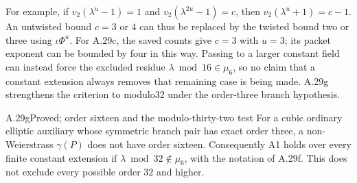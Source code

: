 For example, if $v_2(\lambda^u-1)=1$ and
$v_2(\lambda^{2u}-1)=c$, then
$v_2(\lambda^u+1)=c-1$. An untwisted bound
$c=3$ or $4$ can thus be replaced by the twisted
bound two or three using $\iota\Phi^u$. For A.29c,
the saved counts give $c=3$ with $u=3$; its
packet exponent can be bounded by four in this
way. Passing to a larger constant field can
instead force the excluded residue
$\lambda\bmod16\in\mu_6$, so no claim that a
constant extension always removes that remaining
case is being made. A.29g strengthens the criterion to modulo32
under the order-three branch hypothesis.

\begin{claim}{A.29g}{Proved; order sixteen and the modulo-thirty-two test}
For a cubic ordinary elliptic auxiliary whose symmetric branch pair has
exact order three, a non-Weierstrass $\gamma(P)$ does not have order
sixteen. Consequently A1 holds over every finite constant extension if
$\lambda\bmod32\notin\mu_6$, with the notation of A.29f. This does not
exclude every possible order $32$ and higher.
\end{claim}
